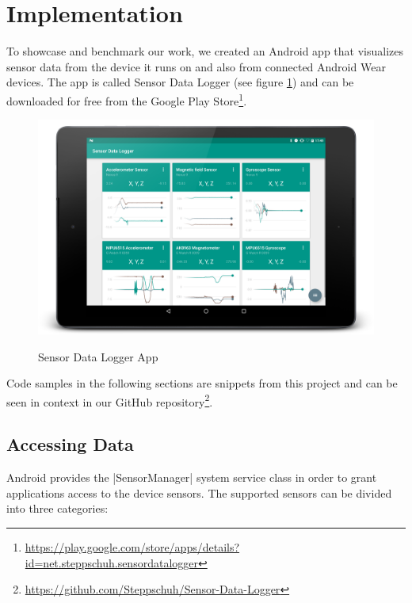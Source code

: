 \section{Implementation}
\label{sec:implementation}

To showcase and benchmark our work, we created an Android app that visualizes sensor data from the device it runs on and also from connected Android Wear devices.
The app is called Sensor Data Logger (see figure \ref{fig:sensorDataLoggerApp}) and can be downloaded for free from the Google Play Store\footnote{\href{https://play.google.com/store/apps/details?id=net.steppschuh.sensordatalogger}{https://play.google.com/store/apps/details?id=net.steppschuh.sensordatalogger}}.

\begin{figure}[H]
	\href{https://github.com/Steppschuh/Sensor-Data-Logger}{
		\includegraphics[width=\linewidth]{images/app/charts_landscape_framed.png}
	}
	\caption[Caption for Sensor Data Logger App]{Sensor Data Logger App}
	\label{fig:sensorDataLoggerApp}
\end{figure}

Code samples in the following sections are snippets from this project and can be seen in context in our GitHub repository\footnote{\href{https://github.com/Steppschuh/Sensor-Data-Logger}{https://github.com/Steppschuh/Sensor-Data-Logger}}.

\clearpage

\subsection{Accessing Data}
\label{sec:implementation:accessingdata}

Android provides the |SensorManager|\cite{androiddocs:sensormanager} system service class in order to grant applications access to the device sensors.
The supported sensors can be divided into three categories:

